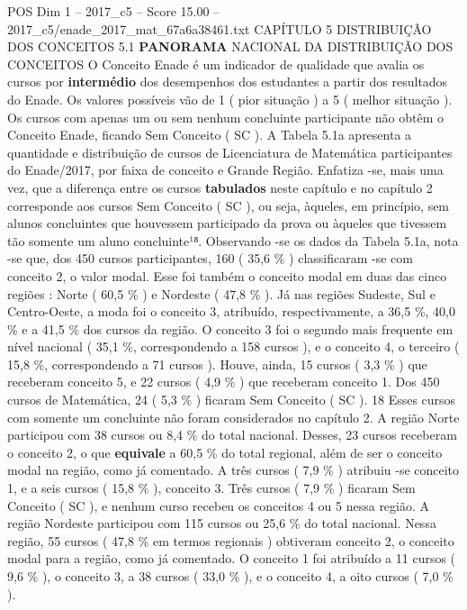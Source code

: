 \begin{textsample}{POS Dim 1 – 2017\_c5 – Score 15.00 – 2017\_c5/enade\_2017\_mat\_67a6a38461.txt}  \label{ex:f1_pos_059}
CAPÍTULO 5 DISTRIBUIÇÃO DOS CONCEITOS 5.1 \textbf{PANORAMA} NACIONAL DA DISTRIBUIÇÃO DOS CONCEITOS O Conceito Enade é um indicador de qualidade que avalia os cursos por \textbf{intermédio} dos desempenhos dos estudantes a partir dos resultados do Enade.
Os valores possíveis vão de 1 ( pior situação ) a 5 ( melhor situação ).
Os cursos com apenas um ou sem nenhum concluinte participante não obtêm o Conceito Enade, ficando Sem Conceito ( SC ).
A Tabela 5.1a apresenta a quantidade e distribuição de cursos de Licenciatura de Matemática participantes do Enade/2017, por faixa de conceito e Grande Região.
Enfatiza -se, mais uma vez, que a diferença entre os cursos \textbf{tabulados} neste capítulo e no capítulo 2 corresponde aos cursos Sem Conceito ( SC ), ou seja, àqueles, em princípio, sem alunos concluintes que houvessem participado da prova ou àqueles que tivessem tão somente um aluno concluinte¹⁸.
Observando -se os dados da Tabela 5.1a, nota -se que, dos 450 cursos participantes, 160 ( 35,6 \% ) classificaram -se com conceito 2, o valor modal.
Esse foi também o conceito modal em duas das cinco regiões : Norte ( 60,5 \% ) e Nordeste ( 47,8 \% ).
Já nas regiões Sudeste, Sul e Centro-Oeste, a moda foi o conceito 3, atribuído, respectivamente, a 36,5 \%, 40,0 \% e a 41,5 \% dos cursos da região.
O conceito 3 foi o segundo mais frequente em nível nacional ( 35,1 \%, correspondendo a 158 cursos ), e o conceito 4, o terceiro ( 15,8 \%, correspondendo a 71 cursos ).
Houve, ainda, 15 cursos ( 3,3 \% ) que receberam conceito 5, e 22 cursos ( 4,9 \% ) que receberam conceito 1.
Dos 450 cursos de Matemática, 24 ( 5,3 \% ) ficaram Sem Conceito ( SC ). 18 Esses cursos com somente um concluinte não foram considerados no capítulo 2.
A região Norte participou com 38 cursos ou 8,4 \% do total nacional.
Desses, 23 cursos receberam o conceito 2, o que \textbf{equivale} a 60,5 \% do total regional, além de ser o conceito modal na região, como já comentado.
A três cursos ( 7,9 \% ) atribuiu -se conceito 1, e a seis cursos ( 15,8 \% ), conceito 3.
Três cursos ( 7,9 \% ) ficaram Sem Conceito ( SC ), e nenhum curso recebeu os conceitos 4 ou 5 nessa região.
A região Nordeste participou com 115 cursos ou 25,6 \% do total nacional.
Nessa região, 55 cursos ( 47,8 \% em termos regionais ) obtiveram conceito 2, o conceito modal para a região, como já comentado.
O conceito 1 foi atribuído a 11 cursos ( 9,6 \% ), o conceito 3, a 38 cursos ( 33,0 \% ), e o conceito 4, a oito cursos ( 7,0 \% ).

\end{textsample}
